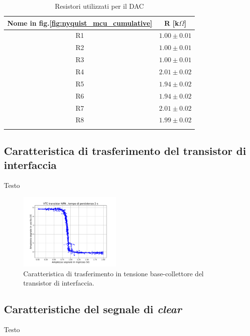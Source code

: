 \documentclass[journal]{IEEEtran}
\begin{document}
\begin{table}[H]
\begin{center}
\caption{Resistori utilizzati per il DAC}
\begin{tabular}{c|c}
Nome in fig.\ref{fig:nyquist_mcu_cumulative} & R [k$\Omega $] \\ \hline
R1  & $1.00 \pm 0.01$ \\
R2  & $1.00 \pm 0.01$ \\
R3  & $1.00 \pm 0.01$ \\
R4  & $2.01 \pm 0.02$ \\
R5  & $1.94 \pm 0.02$ \\
R6  & $1.94 \pm 0.02$ \\
R7  & $2.01 \pm 0.02$ \\
R8  & $1.99 \pm 0.02$ \\
\label{tab:resistori_dac}
\end{tabular}
\end{center}
\end{table}


\subsection{Caratteristica di trasferimento del transistor di interfaccia}
Testo

\begin{figure}[H]%
\begin{center}
\includegraphics[width=0.45\textwidth]{analysis/output/NPN-XY.pdf}
\caption{Caratteristica di trasferimento in tensione base-collettore del transistor di interfaccia.}
\label{fig:inverter_ring_xy}
\end{center}
\end{figure}


\subsection{Caratteristiche del segnale di \textit{clear}}
Testo
\end{document}

